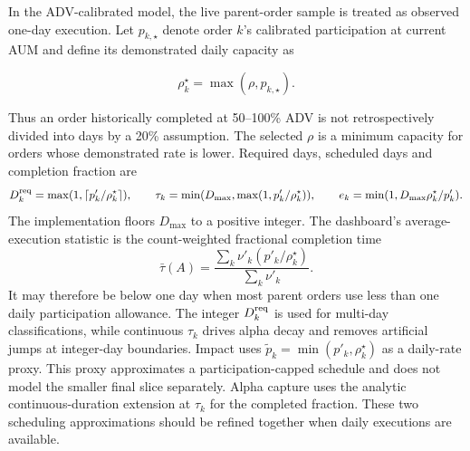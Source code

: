 \documentclass[11pt,a4paper]{article}
\numberwithin{equation}{section}
\begin{document}
In the ADV-calibrated model, the live parent-order sample is treated as observed one-day
execution. Let $p_{k,\star}$ denote order $k$'s calibrated participation at current AUM and define
its demonstrated daily capacity as

\begin{equation}\label{eq:demonstratedcapacity}
 \rho_k^\star=\max(\rho,p_{k,\star}).
\end{equation}

Thus an order historically completed at 50--100\% ADV is not retrospectively divided into days by
a 20\% assumption. The selected $\rho$ is a minimum capacity for orders whose demonstrated rate
is lower. Required days, scheduled days and completion fraction are
\begin{equation}\label{eq:advexecution}
 D_k^{\rm req}=\max(1,\lceil p'_k/\rho_k^\star\rceil),\qquad
 \tau_k=\min(D_{\max},\max(1,p'_k/\rho_k^\star)),\qquad
 e_k=\min(1,D_{\max}\rho_k^\star/p'_k).
\end{equation}
The implementation floors $D_{\max}$ to a positive integer. The dashboard's average-execution
statistic is the count-weighted fractional completion
time
\begin{equation}\label{eq:averageexecution}
 \bar\tau(A)=\frac{\sum_k\nu'_k(p'_k/\rho_k^\star)}{\sum_k\nu'_k}.
\end{equation}
It may therefore be below one day when most parent orders use less than one daily participation
allowance. The integer $D_k^{\rm req}$ is used for multi-day classifications, while continuous
$\tau_k$ drives alpha decay and removes artificial jumps at integer-day boundaries. Impact uses
$\widetilde p_k=\min(p'_k,\rho_k^\star)$ as a daily-rate proxy.
This proxy approximates a participation-capped schedule and does not model the smaller final
slice separately. Alpha capture uses the analytic continuous-duration extension at $\tau_k$ for
the completed fraction.
These two scheduling approximations should be refined together when daily executions are available.
\end{document}
